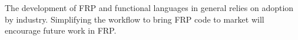 \documentclass[preprint]{sigplanconf}
\begin{document}
The development of FRP and functional languages in general relies on adoption by industry.
Simplifying the workflow to bring FRP code to market will encourage future work in FRP.







\end{document}
